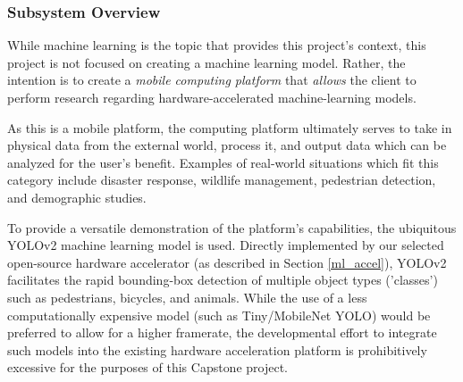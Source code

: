 
% 

\subsubsection{Subsystem Overview} \label{ml_desc}
While machine learning is the topic that provides this project's context, this project is not focused on creating a machine learning model. Rather, the intention is to create a \textit{mobile computing platform} that \textit{allows} the client to perform research regarding hardware-accelerated machine-learning models.

As this is a mobile platform, the computing platform ultimately serves to take in physical data from the external world, process it, and output data which can be analyzed for the user's benefit. Examples of real-world situations which fit this category include disaster response, wildlife management, pedestrian detection, and demographic studies.

To provide a versatile demonstration of the platform's capabilities, the ubiquitous YOLOv2 machine learning model is used. Directly implemented by our selected open-source hardware accelerator (as described in Section \ref{ml_accel}), YOLOv2 facilitates the rapid bounding-box detection of multiple object types ('classes') such as pedestrians, bicycles, and animals. While the use of a less computationally expensive model (such as Tiny/MobileNet YOLO) would be preferred to allow for a higher framerate, the developmental effort to integrate such models into the existing hardware acceleration platform is prohibitively excessive for the purposes of this Capstone project.

